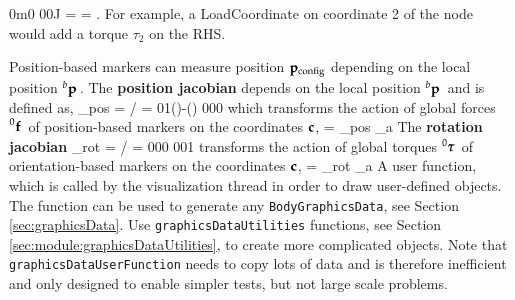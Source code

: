     \finishTable
    \be 
       {0}{m}{0} {0}{0}{J}  =  = \fv.
    \ee
    For example, a LoadCoordinate on coordinate 2 of the node would add a torque $\tau_2$ on the RHS.
    
    Position-based markers can measure position $\mathbf{p}_\mathrm{config}$ depending on the local position $\prescript{b}{}{\mathbf{p}}\,$. 
    The {\bf position jacobian} depends on the local position $\prescript{b}{}{\mathbf{p}}\,$ and is defined as,
    \be
      \Jm_{pos} = \partial \pv\cCur / \partial \cv\cCur =  
                                                             {0}{1}{\cos(\theta)-\sin(\theta)} {0}{0}{0}
    \ee
    which transforms the action of global forces $\prescript{0}{}{\mathbf{f}}\,$ of position-based markers on the coordinates $\mathbf{c}$,
    \be
      \Qm = \Jm_{pos} _a
    \ee
    The {\bf rotation jacobian}  
    \be
      \Jm_{rot} = \partial \pv\cCur / \partial \cv\cCur =  {0}{0}{0} {0}{0}{1}
    \ee
    transforms the action of global torques $\prescript{0}{}{\mbox{\boldmath $\tau$ \unboldmath}\!\!}\,$ of orientation-based markers on the coordinates $\mathbf{c}$,
    \be
      \Qm = \Jm_{rot} _a
    \ee
    A user function, which is called by the visualization thread in order to draw user-defined objects.
    The function can be used to generate any \texttt{BodyGraphicsData}, see Section \ref{sec:graphicsData}.
    Use \texttt{graphicsDataUtilities} functions, see Section \ref{sec:module:graphicsDataUtilities}, to create more complicated objects. 
    Note that \texttt{graphicsDataUserFunction} needs to copy lots of data and is therefore
    inefficient and only designed to enable simpler tests, but not large scale problems.

